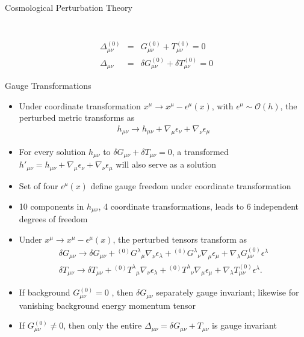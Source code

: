 \documentclass[8pt,aspectratio=1610]{beamer}
\begin{document}
\begin{frame}{Cosmological Perturbation Theory}
\begin{columns}
\begin{column}{0.3\linewidth}
\begin{figure}[t]
			\end{figure}
		\end{column}
	\end{columns}
		\begin{eqnarray}
		\Delta_{\mu\nu}^{(0)} &=& G_{\mu\nu}^{(0)} + T_{\mu\nu}^{(0)} =0
		\\
		\Delta_{\mu\nu} &=& \delta G_{\mu\nu}^{(0)} + \delta T_{\mu\nu}^{(0)}=0
		\end{eqnarray}
		\let\thefootnote\relax{}
\end{frame}


\begin{frame}{Gauge Transformations}
	\begin{itemize}
		\item 	Under coordinate transformation $x^\mu \to x^\mu - \epsilon^\mu(x)$, with $\epsilon^\mu \sim \mathcal O(h)$, the perturbed metric transforms as
			\begin{eqnarray}
				h_{\mu\nu} \to h_{\mu\nu} + \nabla_\mu \epsilon_\nu + \nabla_\nu \epsilon_\mu
			\end{eqnarray}
		\item 	For every solution $h_{\mu\nu}$ to $\delta G_{\mu\nu} + \delta T_{\mu\nu} = 0$, a transformed $h'_{\mu\nu} = h_{\mu\nu} + \nabla_\mu \epsilon_\nu + \nabla_\nu \epsilon_\mu$ will also serve as a solution
		\item Set of four $\epsilon^\mu(x)$ define gauge freedom under coordinate transformation
		\item 10 components in $h_{\mu\nu}$, 4 coordinate transformations, leads to 6 independent degrees of freedom
		\item Under $x^\mu \to x^\mu - \epsilon^\mu(x)$, the perturbed tensors transform as
			\begin{eqnarray}
				\delta G_{\mu\nu} \to \delta G_{\mu\nu} + {}^{(0)}G^\lambda{}_\mu \nabla_\nu \epsilon_\lambda +  {}^{(0)}G^{\lambda}{}_{\nu}\nabla_\mu \epsilon_\mu + \nabla_\lambda  G^{(0)}_{\mu\nu} \epsilon^\lambda
				\nonumber\\
				\delta T_{\mu\nu} \to \delta T_{\mu\nu} + {}^{(0)}T^\lambda{}_\mu \nabla_\nu \epsilon_\lambda +  {}^{(0)}T^{\lambda}{}_{\nu}\nabla_\mu \epsilon_\mu + \nabla_\lambda  T^{(0)}_{\mu\nu} \epsilon^\lambda.
			\end{eqnarray}
		\item If background $G_{\mu\nu}^{(0)} = 0$ , then $\delta G_{\mu\nu}$ separately gauge invariant; likewise for vanishing background energy momentum tensor
		\item If $G_{\mu\nu}^{(0)} \ne 0$, then only the entire $\Delta_{\mu\nu} = \delta G_{\mu\nu} + T_{\mu\nu}$ is gauge invariant
	\end{itemize}


\end{frame}
\end{document}
